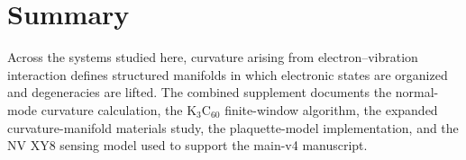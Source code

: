 \documentclass[12pt]{article}
\begin{document}
\section*{Summary}

Across the systems studied here, curvature arising from electron--vibration
interaction defines structured manifolds in which electronic states are
organized and degeneracies are lifted. The combined supplement documents the
normal-mode curvature calculation, the K$_3$C$_{60}$ finite-window algorithm,
the expanded curvature-manifold materials study, the plaquette-model
implementation, and the NV XY8 sensing model used to support the main-v4
manuscript.



\end{document}
